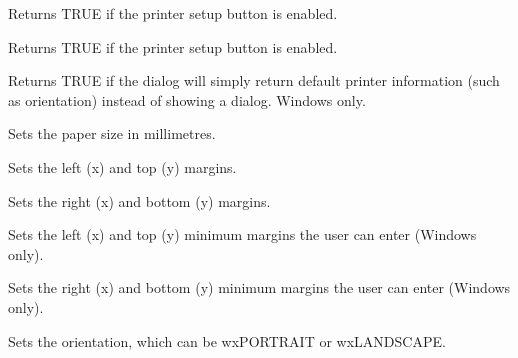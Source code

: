 Returns TRUE if the printer setup button is enabled.



Returns TRUE if the printer setup button is enabled.



Returns TRUE if the dialog will simply return default printer information (such as orientation)
instead of showing a dialog. Windows only.



Sets the paper size in millimetres.



Sets the left (x) and top (y) margins.



Sets the right (x) and bottom (y) margins.



Sets the left (x) and top (y) minimum margins the user can enter (Windows only).



Sets the right (x) and bottom (y) minimum margins the user can enter (Windows only).



Sets the orientation, which can be wxPORTRAIT or wxLANDSCAPE.



